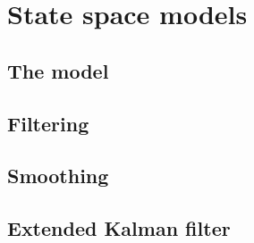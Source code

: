 \section{State space models}
\subsection{The model}
\subsection{Filtering}
\subsection{Smoothing}
\subsection{Extended Kalman filter}